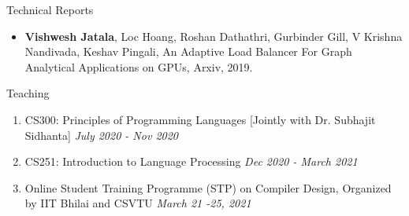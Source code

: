 \documentclass{resume} %
\begin{document}
\begin{rSection}{Technical Reports}
\begin{itemize}
\item \textbf{Vishwesh Jatala}, Loc Hoang, Roshan Dathathri, Gurbinder Gill, V Krishna Nandivada, Keshav Pingali, An Adaptive Load Balancer For Graph Analytical Applications on GPUs, Arxiv, 2019. 
\end{itemize}
\end{rSection}




\begin{comment}
\begin{rSection}{Ph.D Thesis}{\hspace{6 mm}   \textit{Thesis Supervisor : Prof. Amey Karkare, Department of CSE, IIT Kanpur }}

\begin{itemize}
\item \textbf{Title:} Hardware and Software Optimizations for GPU Resource Management
\end{itemize}

\end{rSection}
\end{comment}


\begin{rSection}{Teaching}
	\begin{enumerate}
		\item CS300: Principles of Programming Languages [{\scriptsize Jointly with Dr. Subhajit Sidhanta}] \hfill {\em July 2020 - Nov 2020}
		\item CS251: Introduction to Language Processing \hfill {\em Dec 2020 - March 2021}
		\item Online Student Training Programme (STP) on Compiler Design, Organized by IIT Bhilai and CSVTU  \hfill {\em March 21 -25, 2021}
	\end{enumerate}
\end{rSection}
\end{document}
